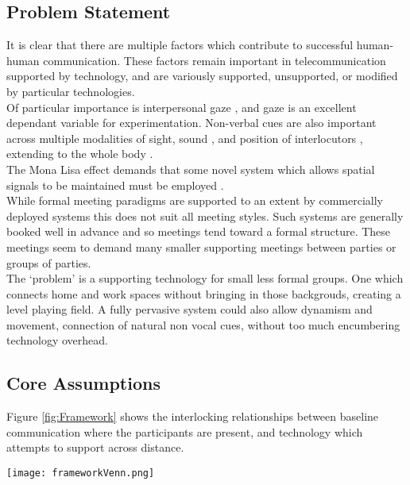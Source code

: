 \subsection{Problem Statement}

        
            It is clear that there are multiple factors which contribute to successful human-human communication. These factors remain important in telecommunication supported by technology, and are variously supported, unsupported, or modified by particular technologies.\\
            Of particular importance is interpersonal gaze \cite{Cook1977, Kleinke1986a, Fagel2010}, and gaze is an excellent dependant variable for experimentation. Non-verbal cues are also important across multiple modalities of sight, sound \cite{Otsuka2005}, and position of interlocutors \cite{Kendon1967}, extending to the whole body \cite{Kleinke1986a, Nguyen2009}.\\
            The Mona Lisa effect demands that some novel system which allows spatial signals to be maintained must be employed \cite{Moubayed2012}.\\
            While formal meeting paradigms are supported to an extent by commercially deployed systems this does not suit all meeting styles. Such systems are generally booked well in advance and so meetings tend toward a formal structure. These meetings seem to demand many smaller supporting meetings between parties or groups of parties.\\
The `problem' is a supporting technology for small less formal groups. One which connects home and work spaces without bringing in those backgrouds, creating a level playing field. A fully pervasive system could also allow dynamism and movement, connection of natural non vocal cues, without too much encumbering technology overhead.
            
            \subsection{Core Assumptions}
                Figure \ref{fig:Framework} shows the interlocking relationships between baseline communication where the participants are present, and technology which attempts to support across distance.
                \begin{figure*}[h]
                \centering
                \texttt{[image: frameworkVenn.png]}
                \caption{The Venn diagram shows areas of research which have been identified in blue. These interlock and overlap as shown. The most relevant identified researchers from the literature are shown in black close to the fields of study which they represent. This diagram is a view of the core assumptions for the research, with the most important fields at the centre. }
                \label{fig:Framework}
                \end{figure*}
                
